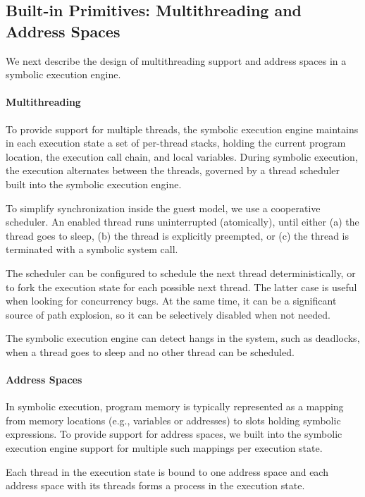 \subsection{Built-in Primitives: Multithreading and Address Spaces}

We next describe the design of multithreading support and address spaces in a symbolic execution engine.

\paragraph{Multithreading}

To provide support for multiple threads, the symbolic execution engine maintains in each execution state a set of per-thread stacks, holding the current program location, the execution call chain, and local variables.
%
During symbolic execution, the execution alternates between the threads, governed by a thread scheduler built into the symbolic execution engine.

To simplify synchronization inside the guest model, we use a cooperative scheduler.  An enabled thread runs uninterrupted (atomically), until either (a) the thread goes to sleep, (b) the thread is explicitly preempted, or (c) the thread is terminated with a symbolic system call.

The scheduler can be configured to schedule the next thread deterministically, or to fork the execution state for each possible next thread.
%
The latter case is useful when looking for concurrency bugs.  At the same time, it can be a significant source of path explosion, so it can be selectively disabled when not needed.

The symbolic execution engine can detect hangs in the system, such as deadlocks, when a thread goes to sleep and no other thread can be scheduled.

\paragraph{Address Spaces}

In symbolic execution, program memory is typically represented as a mapping from memory locations (e.g., variables or addresses) to slots holding symbolic expressions.
%
To provide support for address spaces, we built into the symbolic execution engine support for multiple such mappings per execution state.

Each thread in the execution state is bound to one address space and each address space with its threads forms a process in the execution state.

